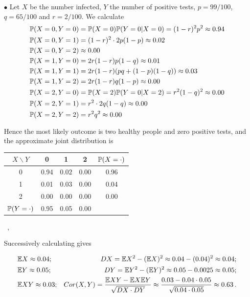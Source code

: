 \documentclass[a4paper]{report}
\begin{document}
\begin{problem}
\begin{enumerate}
    $\bullet$ Let $X$ be the number infected, $Y$ the number of positive tests, $p=99/100$, $q=65/100$
    and $r=2/100$. We calculate
    \begin{align*}
        &\P(X = 0, Y=0) =
        \P(X=0)\P(Y=0|X=0) =
        (1-r)^2 p^2\approx 0.94\\
        &\P(X = 0, Y=1) = (1-r)^2\cdot 2p(1-p)        \approx 0.02\\
        &\P(X = 0, Y=2) \approx 0.00\\
        &\P(X = 1, Y=0) = 2r(1-r)p(1-q)\approx 0.01\\
        &\P(X = 1, Y=1) = 2r(1-r)(pq + (1-p)(1-q))\approx0.03\\
        &\P(X = 1, Y=2) = 2r(1-r)q(1-p)\approx0.00\\
        &\P(X = 2, Y=0) = \P(X=2)\P(Y=0|X=2) = r^2(1-q)^2\approx 0.00\\
        &\P(X = 2, Y=1) = r^2\cdot 2q(1-q)\approx 0.00\\
        &\P(X = 2, Y=2) = r^2q^2\approx 0.00\\
    \end{align*}

Hence the most likely outcome is two healthy people and zero positive tests, and the approximate joint distribution is
    \begin{center}
\begin{tabular}{ |c|c|c|c|c| }
 \hline
$X \backslash Y$ & 0 & 1 & 2& $\P(X = \cdot)$ \\
  \hline
 0 & 0.94& $ 0.02$ &   0.00&0.96\\
 1 &  0.01 &  0.03 &  0.00&0.04\\
 2 & 0.00& 0.00& 0.00&0.00\\
 \hline
 $\P(Y = \cdot)$ &0.95& 0.05 &  0.00& \\
  \hline
  \end{tabular} \, ,
 \end{center}

Successively calculating gives

\begin{align*}
    &\E X \approx 0.04;    &D X = \E X^2 - (\E X)^2 \approx 0.04 - (0.04)^2 \approx 0.04;\\
    &\E Y \approx 0.05;    &D Y =  \E Y^2 - (\E Y)^2 \approx 0.05-0.0025 \approx 0.05;\\
    &\E XY \approx 0.03;
    &Cor(X,Y) = \frac{\E XY - \E X \E Y}{\sqrt{D X \cdot D Y}} \approx
    \frac{0.03 - 0.04\cdot0.05 }{\sqrt{0.04\cdot0.05}} \approx 0.63 \, .
\end{align*}

\end{enumerate}

\end{problem}
\end{document}
